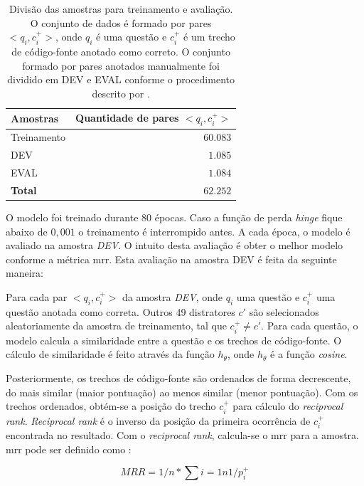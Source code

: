 \begin{table}[h]
\centering
\begin{tabular}{ p{3cm} r  }
 \hline
 \textbf{Amostras} & \textbf{Quantidade de pares $<q_{i}, c_{i}^{+}>$}\\
 \hline
 Treinamento & $60.083$\\
 
 DEV & $1.085$ \\
 
 EVAL & $1.084$\\
 \hline
 \textbf{Total} & $\bm{62.252}$\\
 \hline
\end{tabular}
\caption{Divisão das amostras para treinamento e avaliação. O conjunto de dados é formado por pares $<q_{i}, c_{i}^{+}>$, onde $q_{i}$ é uma questão e $c_{i}^{+}$ é um trecho de código-fonte anotado como correto. O conjunto formado por pares anotados manualmente foi dividido em DEV e EVAL conforme o procedimento descrito por \cite{iyer-etal-2016-summarizing}.}
\label{table:divisao-amostras}
\end{table}

O modelo foi treinado durante 80 épocas. Caso a função de perda \textit{hinge} fique abaixo de $0,001$ o treinamento é interrompido antes. A cada época, o modelo é avaliado na amostra \emph{DEV}. O intuito desta avaliação é obter o melhor modelo conforme a métrica \acrshort{mrr}. Esta avaliação na amostra DEV é feita da seguinte maneira:

Para cada par $<q_{i}, c_{i}^{+}>$ da amostra \emph{DEV}, onde $q_{i}$ uma questão e $c_{i}^{+}$ uma questão anotada como correta. Outros 49 distratores $c'$ são selecionados aleatoriamente da amostra de treinamento, tal que $c_{i}^{+} \neq c'$. Para cada questão, o modelo calcula a similaridade entre a questão e os trechos de código-fonte. O cálculo de similaridade é feito através da função $h_{\theta}$, onde $h_{\theta}$ é a função \textit{cosine}. 

Posteriormente, os trechos de código-fonte são ordenados de forma decrescente, do mais similar (maior pontuação) ao menos similar (menor pontuação). Com os trechos ordenados, obtém-se a posição do trecho $c_{i}^{+}$ para cálculo do \textit{reciprocal rank}. \textit{Reciprocal rank} é o inverso da posição da primeira ocorrência de $c_{i}^{+}$ encontrada no resultado. Com o \textit{reciprocal rank}, calcula-se o \acrshort{mrr} para a amostra. \acrshort{mrr} pode ser definido como :

\begin{equation}
MRR = 1/n * \sum{i = 1}{n}{1 / p_{i}^{+}}
\end{equation}

